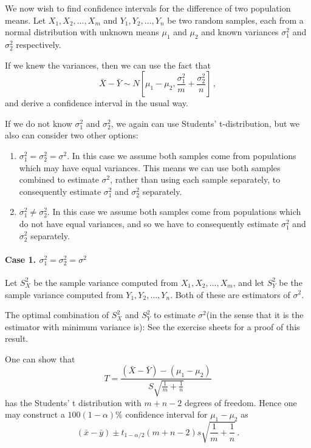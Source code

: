 \documentclass[12pt]{article}
\begin{document}
We now wish to find confidence intervals for the difference of two population means. Let $X_{1},X_{2},\ldots, X_{m}$ and $Y_{1},Y_{2},\ldots,Y_{n}$ be two random samples, each from a normal distribution with unknown means $\mu_{1}$ and $\mu_{2}$ and known variances $\sigma_{1}^{2}$ and $\sigma_{2}^{2}$ respectively.

If we knew the variances, then we can use the fact that
$$\bar{X}-\bar{Y}\sim N \left[\mu_{1}-\mu_{2},\frac{\sigma_{1}^{2}}{m}+\frac{\sigma_{2}^{2}}{n}\right]\, ,$$
and derive a confidence interval in the usual way.

If we do not know $\sigma_{1}^{2}$ and $\sigma_{2}^{2}$, we again can use Students' t-distribution, but we also can consider two other options:
\begin{enumerate}
\item $\sigma_{1}^{2}=\sigma_{2}^{2}=\sigma^{2}.$ In this case we assume both samples come from populations which may have equal variances. This means we can use both samples combined to estimate $\sigma^2$, rather than using each sample separately, to consequently estimate $\sigma_{1}^{2}$ and $\sigma_{2}^{2}$ separately.
\item $\sigma_{1}^{2} \neq \sigma_{2}^{2}.$ In this case we assume both samples come from populations which do not have equal variances, and so we have to consequently estimate $\sigma_{1}^{2}$ and $\sigma_{2}^{2}$ separately.
\end{enumerate}
\paragraph{Case 1. $\sigma_{1}^{2}=\sigma_{2}^{2}=\sigma^{2}$}
Let $S_{X}^{2}$ be the sample variance computed from $X_{1},X_{2},\ldots, X_{m}$, and let $S_{Y}^{2}$ be the sample variance computed from $Y_{1},Y_{2},\ldots,Y_{n}$. Both of these are estimators of $\sigma^{2}$.
\begin{mdframed}
The optimal combination of $S_{X}^{2}$ and $S_{Y}^{2}$ to estimate $\sigma^2$(in the sense that it is the estimator with minimum variance is):
\textcolor[rgb]{1.00,1.00,1.00}{\lipsum[1-2]}
See the exercise sheets for a proof of this result.
\end{mdframed}

One can show that
$$
T=\frac{(\bar{X}-\bar{Y})-(\mu_{1}-\mu_{2})}{S\sqrt{\frac{1}{m}+\frac{1}{n}}}
$$
has the Students' t distribution with $m+n-2$ degrees of freedom. Hence one may construct a $100(1-\alpha)\%$ confidence interval for $\mu_{1}-\mu_{2}$ as
$$
(\bar{x}-\bar{y}) \pm t_{1-\alpha/2}(m+n-2)s\sqrt{\frac{1}{m}+\frac{1}{n}}\, .
$$
\end{document}
